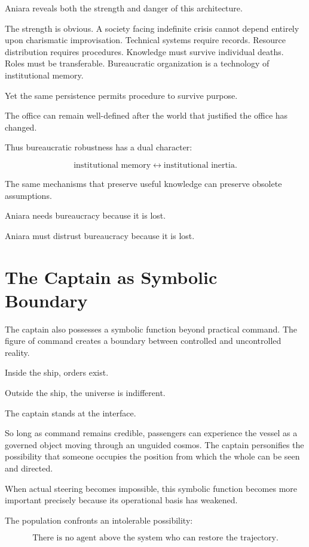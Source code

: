 \documentclass[11pt,oneside]{book}
\theoremstyle{definition}
\theoremstyle{remark}
\begin{document}
Aniara reveals both the strength and danger of this architecture.

The strength is obvious. A society facing indefinite crisis cannot depend entirely upon charismatic improvisation. Technical systems require records. Resource distribution requires procedures. Knowledge must survive individual deaths. Roles must be transferable. Bureaucratic organization is a technology of institutional memory.

Yet the same persistence permits procedure to survive purpose.

The office can remain well-defined after the world that justified the office has changed.

Thus bureaucratic robustness has a dual character:

\[
\text{institutional memory}
\leftrightarrow
\text{institutional inertia}.
\]

The same mechanisms that preserve useful knowledge can preserve obsolete assumptions.

Aniara needs bureaucracy because it is lost.

Aniara must distrust bureaucracy because it is lost.

\section{The Captain as Symbolic Boundary}

The captain also possesses a symbolic function beyond practical command. The figure of command creates a boundary between controlled and uncontrolled reality.

Inside the ship, orders exist.

Outside the ship, the universe is indifferent.

The captain stands at the interface.

So long as command remains credible, passengers can experience the vessel as a governed object moving through an unguided cosmos. The captain personifies the possibility that someone occupies the position from which the whole can be seen and directed.

When actual steering becomes impossible, this symbolic function becomes more important precisely because its operational basis has weakened.

The population confronts an intolerable possibility:

\[
\text{There is no agent above the system who can restore the trajectory.}
\]
\end{document}

